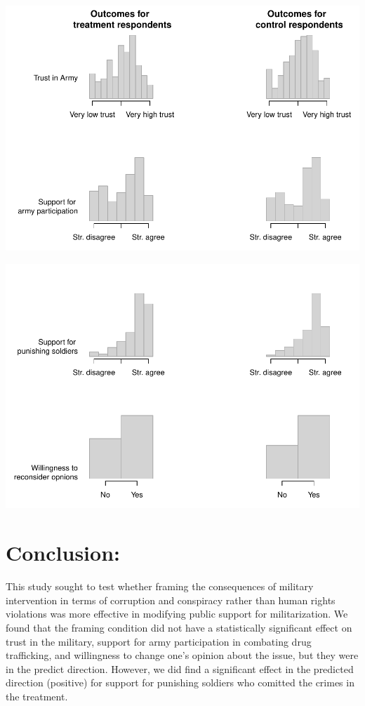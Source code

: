 \documentclass[
  12pt,
]{article}
\begin{document}
\includegraphics{marko-oliver_final-proj_files/figure-latex/unnamed-chunk-8-1.pdf}

\includegraphics{marko-oliver_final-proj_files/figure-latex/unnamed-chunk-9-1.pdf}

\hypertarget{conclusion}{%
\section{Conclusion:}\label{conclusion}}

This study sought to test whether framing the consequences of military
intervention in terms of corruption and conspiracy rather than human
rights violations was more effective in modifying public support for
militarization. We found that the framing condition did not have a
statistically significant effect on trust in the military, support for
army participation in combating drug trafficking, and willingness to
change one's opinion about the issue, but they were in the predict
direction. However, we did find a significant effect in the predicted
direction (positive) for support for punishing soldiers who comitted the
crimes in the treatment.
\end{document}
